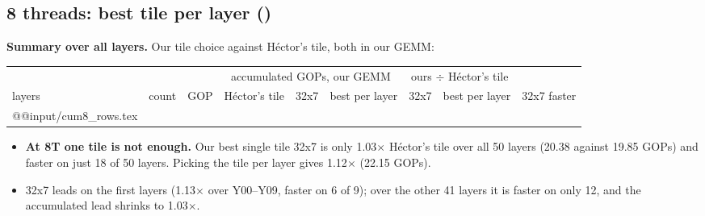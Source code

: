\subsection{8 threads: best tile per layer ()}\label{sec:8t}
\textbf{Summary over all layers.} Our tile choice against H\'ector's tile, both in our GEMM:
\begin{center}\small\setlength\tabcolsep{4pt}
\begin{tabular}{@{}l r r rrr rr c@{}}
\toprule
 & & & \multicolumn{3}{c}{accumulated GOPs, our GEMM} & \multicolumn{2}{c}{ours $\div$ H\'ector's tile} & \\
\cmidrule(lr){4-6}\cmidrule(lr){7-8}
layers & count & GOP & H\'ector's tile & 32x7 & best per layer & 32x7 & best per layer & 32x7 faster \\
\midrule
\csname @@input\endcsname \V/cum8_rows.tex
\bottomrule
\end{tabular}
\end{center}
\begin{itemize}\setlength\itemsep{1pt}
\item \textbf{At 8T one tile is not enough.} Our best single tile 32x7 is only 1.03$\times$ H\'ector's tile over all 50 layers (20.38 against 19.85 GOPs) and faster on just 18 of 50 layers. Picking the tile per layer gives 1.12$\times$ (22.15 GOPs).
\item 32x7 leads on the first layers (1.13$\times$ over Y00--Y09, faster on 6 of 9); over the other 41 layers it is faster on only 12, and the accumulated lead shrinks to 1.03$\times$.
\end{itemize}

